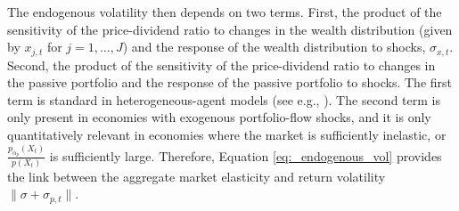 The endogenous volatility then depends on two terms. First, the product of the sensitivity of the price-dividend ratio to changes in the wealth distribution (given by $x_{j,t}$ for $j = 1,\ldots, J$) and the response of the wealth distribution to shocks, $\sigma_{x,t}$. Second, the product of the sensitivity of the price-dividend ratio to changes in the passive portfolio and the response of the passive portfolio to shocks. 
The first term is standard in heterogeneous-agent models (see e.g., \citealt{panageas2020implications}).
The second term is only present in economies with exogenous portfolio-flow shocks, and it is only quantitatively relevant in economies where the market is sufficiently inelastic, or $\frac{p_{\overline{\alpha}_p}(X_t)}{p(X_t)} $ is sufficiently large.
Therefore, Equation \eqref{eq:_endogenous_vol} provides the link between the aggregate market elasticity and return volatility $\|\sigma+\sigma_{p,t}\|$.



